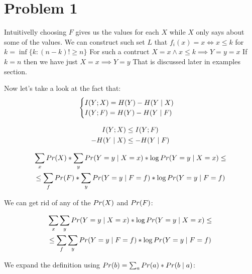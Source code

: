 

\section{Problem 1}

Intuitivelly choosing $F$ gives us the values for each $X$ while $X$ only says about some of the values.
We can construct such set $L$ that $f_{i}(x) = x \iff x \leq k$ for $k = \inf\{ k : (n-k)! \geq n \}$
For such a contruct $X=x \land x \leq k \implies Y=y=x$
If $k=n$ then we have just $X=x \implies Y=y$ 
That is discussed later in examples section.


Now let's take a look at the fact that:
\begin{equation}
\begin{cases}
    \pri{Y;X} = \pre{Y} - \pre{Y}[X] \\
    \pri{Y;F} = \pre{Y} - \pre{Y}[F]
\end{cases}
\end{equation}

\begin{gather*}
\pri{Y;X} \leq \pri{Y;F} \\
- \pre{Y}[X] \leq - \pre{Y}[F] 
\end{gather*}

\begin{gather*}
\sum_{x}{\prob{X} * \sum_{y}{ \prob{Y=y}[X=x] * \log{\prob{Y=y}[X=x]} }} \leq \\
\leq \sum_{f}{\prob{F} * \sum_{y}{ \prob{Y=y}[F=f] * \log{\prob{Y=y}[F=f]} }} 
\end{gather*}

We can get rid of any of the $\prob{X}$ and $\prob{F}$:

\begin{gather*}
\sum_{x}{\sum_{y}{ \prob{Y=y}[X=x] * \log{\prob{Y=y}[X=x]} }} \leq \\
\leq \sum_{f}{\sum_{y}{ \prob{Y=y}[F=f] * \log{\prob{Y=y}[F=f]} }} 
\end{gather*}

We expand the definition using $\prob{b} = \sum_a{\prob{a} * \prob{b}[a]}$:

